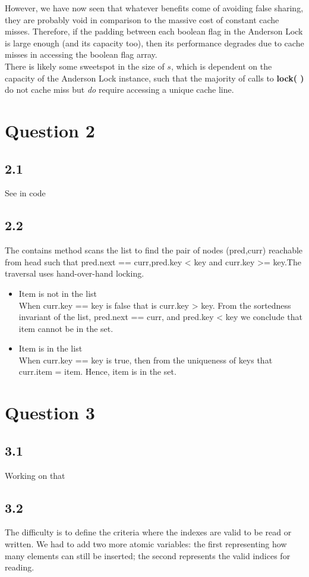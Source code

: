 \documentclass[11pt, letterpaper]{article}
\begin{document}
However, we have now seen that whatever benefits come of avoiding false sharing, they are probably void in comparison to the massive cost of constant cache misses. Therefore, if the padding between each boolean flag in the Anderson Lock is large enough (and its capacity too), then its performance degrades due to cache misses in accessing the boolean flag array.\\

There is likely some sweetspot in the size of $s$, which is dependent on the capacity of the Anderson Lock instance, such that the majority of calls to \textbf{lock( )} do not cache miss but \textit{do} require accessing a unique cache line.

\newpage
\section*{Question 2}
\subsection*{2.1}
See in code
\subsection*{2.2}
The contains method scans the list to find the pair of nodes (pred,curr) reachable from head such that
pred.next == curr,pred.key < key and curr.key >= key.The traversal uses hand-over-hand locking.
\begin{itemize}
\item Item is not in the list \\
When curr.key == key is false that is curr.key > key. From the sortedness
invariant of the list, pred.next == curr, and pred.key < key we conclude that item cannot be in the
set.

 \item Item is in the list \\
When curr.key == key is true, then from the uniqueness of keys that curr.item = item. Hence, item is in the set.
\end{itemize}

\newpage
\section*{Question 3}
\subsection*{3.1}
Working on that
\subsection*{3.2}
The difficulty is to define the criteria where the indexes are valid to be read or written. We had to add two more atomic variables: the first representing how many elements can still be inserted; the second represents the valid indices for reading.
\end{document}
